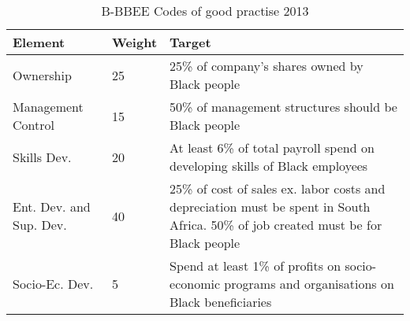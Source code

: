 \begin{table}[H] %
\centering
\caption{B-BBEE Codes of good practise 2013}
\begin{tabular}{m{4cm} m{1.5cm} m{5.5cm}} %
\bottomrule
Element & Weight & Target\\
\midrule
Ownership & 25 & 25\% of company's shares owned by Black people \\ 
Management Control & 15 & 50\% of management structures should be Black people \\ 
Skills Dev. & 20 & At least 6\% of total payroll spend on developing skills of Black employees \\ 
Ent. Dev. and Sup. Dev. & 40 & 25\% of  cost of sales ex. labor costs and depreciation must be spent in South Africa. 50\% of job created must be for Black people \\ 
Socio-Ec. Dev. & 5 & Spend at least 1\% of profits on socio-economic programs and organisations on Black beneficiaries \\ 
\bottomrule
\end{tabular}
\end{table}%